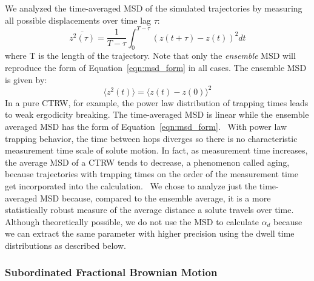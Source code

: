\documentclass{article}
\begin{document}
  We analyzed the time-averaged MSD of the simulated trajectories by measuring
  all possible displacements over time lag $\tau$:
  \begin{equation}
  \overline{z^2(\tau)} = \dfrac{1}{T - \tau}\int_{0}^{T - \tau} (z(t + \tau) - z(t))^2 dt
  \end{equation}
  where T is the length of the trajectory. Note that only the \textit{ensemble} MSD
  will reproduce the form of Equation~\ref{eqn:msd_form} in all cases. The ensemble
  MSD is given by:
  \begin{equation}
  \langle z^2(t) \rangle = \langle z(t) - z(0) \rangle^2
  \label{eqn:ensemble_msd}
  \end{equation} 
  In a pure CTRW, for example, the power law distribution of trapping times leads to
  weak ergodicity breaking. The time-averaged MSD is linear while the ensemble averaged
  MSD has the form of Equation~\ref{eqn:msd_form}.~\cite{meroz_toolbox_2015} With power
  law trapping behavior, the time between hops diverges so there is no characteristic
  measurement time scale of solute motion. In fact, as measurement time increases, the 
  average MSD of a CTRW tends to decrease, a phenomenon called aging, because trajectories 
  with trapping times on the order of the measurement time get incorporated into the 
  calculation.~\cite{bel_weak_2005} We chose to analyze just the time-averaged MSD 
  because, compared to the ensemble average, it is a more statistically robust measure
  of the average distance a solute travels over time. Although theoretically possible, we do
  not use the MSD to calculate $\alpha_d$ because we can extract the same parameter 
  with higher precision using the dwell time distributions as described below.
  
  
  \subsubsection{Subordinated Fractional Brownian Motion}\label{method:sfbm}

\end{document}
